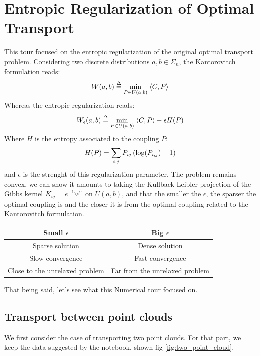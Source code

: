 \section{Entropic Regularization of Optimal Transport}

This tour focused on the entropic regularization of the original optimal transport problem. Considering two discrete distributions $a,b \in \Sigma_n$, the Kantorovitch formulation reads: 
\begin{equation*}
    W(a,b) \stackrel{\Delta}{=} \underset{P \in U(a,b)}{\min}\; \langle C, P \rangle 
\end{equation*}
Whereas the entropic regularization reads:
\begin{equation*}
    W_\epsilon(a,b) \stackrel{\Delta}{=} \underset{P \in U(a,b)}{\min}\; \langle C, P \rangle - \epsilon H(P)
\end{equation*}
Where $H$ is the entropy associated to the coupling $P$:
\begin{equation*}
    H(P) = \sum_{i, j} P_{ij} \left( \log(P_{i,j}) - 1 \right)
\end{equation*}
and $\epsilon$ is the strenght of this regularization parameter. The problem remains convex, we can show it amounts to taking the Kullback Leibler projection of the Gibbs kernel $K_{ij} = e^{-C_{ij}/\epsilon}$ on $U(a,b)$, and that the smaller the $\epsilon$, the sparser the optimal coupling is and the closer it is from the optimal coupling related to the Kantorovitch formulation. 

\begin{table}[h]
\centering
\begin{tabular}{cc}
\textbf{Small $\epsilon$}      & \textbf{Big $\epsilon$}        \\ \hline
Sparse solution                & Dense solution                 \\ 
Slow convergence               & Fast convergence               \\ 
Close to the unrelaxed problem & Far from the unrelaxed problem \\ 
\end{tabular}
\end{table}

That being said, let's see what this Numerical tour focused on.

\subsection{Transport between point clouds}

We first consider the case of transporting two point clouds. For that part, we keep the data suggested by the notebook, shown fig \ref{fig:two_point_cloud}. 

